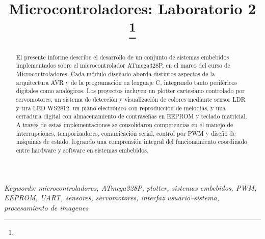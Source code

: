 \documentclass[conference]{IEEEtran}
\begin{document}
\title{Microcontroladores: Laboratorio 2\\
{\footnotesize \textsuperscript{}
}
\thanks{}
}

\author{
\and
{}
}
\maketitle


\begin{abstract}
El presente informe describe el desarrollo de un conjunto de sistemas embebidos implementados sobre el microcontrolador ATmega328P, en el marco del curso de Microcontroladores. Cada módulo diseñado aborda distintos aspectos de la arquitectura AVR y de la programación en lenguaje C, integrando tanto periféricos digitales como analógicos.  
Los proyectos incluyen un plotter cartesiano controlado por servomotores, un sistema de detección y visualización de colores mediante sensor LDR y tira LED WS2812, un piano electrónico con reproducción de melodías, y una cerradura digital con almacenamiento de contraseñas en EEPROM y teclado matricial.  
A través de estas implementaciones se consolidaron competencias en el manejo de interrupciones, temporizadores, comunicación serial, control por PWM y diseño de máquinas de estado, logrando una comprensión integral del funcionamiento coordinado entre hardware y software en sistemas embebidos.
\end{abstract}

\textit{Keywords: microcontroladores, ATmega328P, plotter, sistemas embebidos, PWM, EEPROM, UART, sensores, servomotores, interfaz usuario–sistema, procesamiento de imagenes}














            

\nocite{*}


\appendix


\end{document}
